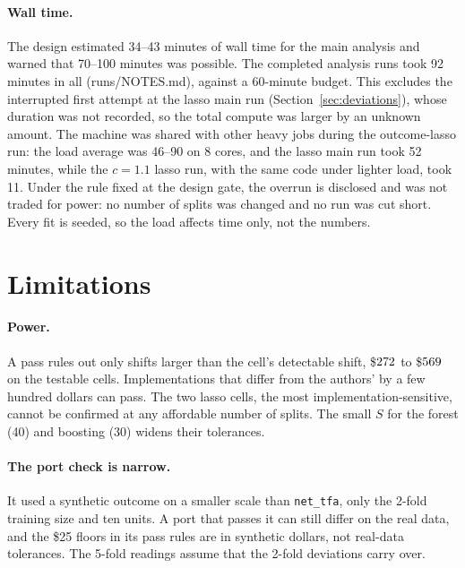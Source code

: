 \documentclass[11pt]{article}
\newcommand{\var}[1]{\texttt{#1}}
\begin{document}
\paragraph{Wall time.} The design estimated 34--43 minutes of wall time for the main
analysis and warned that 70--100 minutes was possible. The completed analysis runs took
92 minutes in all (runs/NOTES.md), against a 60-minute budget. This excludes the
interrupted first attempt at the lasso main run (Section~\ref{sec:deviations}), whose
duration was not recorded, so the total compute was larger by an unknown amount. The machine was shared with other
heavy jobs during the outcome-lasso run: the load average was 46--90 on 8 cores, and the
lasso main run took 52 minutes, while the $c = 1.1$ lasso run, with the same code under
lighter load, took 11. Under the rule fixed at the design gate, the overrun is disclosed
and was not traded for power: no number of splits was changed and no run was cut short.
Every fit is seeded, so the load affects time only, not the numbers.

\FloatBarrier
\section{Limitations}
\label{sec:limitations}

\paragraph{Power.} A pass rules out only shifts larger than the cell's detectable shift,
\$$272$ to \$$569$ on the testable cells. Implementations that
differ from the authors' by a few hundred dollars can pass. The two lasso cells, the most
implementation-sensitive, cannot be confirmed at any affordable number of splits. The
small $S$ for the forest (40) and boosting (30) widens their tolerances.

\paragraph{The port check is narrow.} It used a synthetic outcome on a smaller scale than
\var{net\_tfa}, only the 2-fold training size and ten units. A port that passes it can
still differ on the real data, and the \$25 floors in its pass rules are in synthetic
dollars, not real-data tolerances. The 5-fold readings assume that the 2-fold
deviations carry over.
\end{document}
